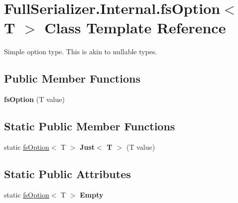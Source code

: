 \hypertarget{struct_full_serializer_1_1_internal_1_1fs_option}{}\section{Full\+Serializer.\+Internal.\+fs\+Option$<$ T $>$ Class Template Reference}
\label{struct_full_serializer_1_1_internal_1_1fs_option}


Simple option type. This is akin to nullable types.  


\subsection*{Public Member Functions}
\begin{DoxyCompactItemize}
\item 
\mbox{\label{struct_full_serializer_1_1_internal_1_1fs_option_a2f7a2155bfce90df62b19977bf6c1e28}} 
{\bfseries fs\+Option} (T value)
\end{DoxyCompactItemize}
\subsection*{Static Public Member Functions}
\begin{DoxyCompactItemize}
\item 
\mbox{\label{struct_full_serializer_1_1_internal_1_1fs_option_a1d4812c279027074394852b9d4305725}} 
static \hyperlink{struct_full_serializer_1_1_internal_1_1fs_option}{fs\+Option}$<$ T $>$ {\bfseries Just$<$ T $>$} (T value)
\end{DoxyCompactItemize}
\subsection*{Static Public Attributes}
\begin{DoxyCompactItemize}
\item 
\mbox{\label{struct_full_serializer_1_1_internal_1_1fs_option_a097ca5b76a5fe79d6b37dd76ec2b5844}} 
static \hyperlink{struct_full_serializer_1_1_internal_1_1fs_option}{fs\+Option}$<$ T $>$ {\bfseries Empty}
\end{DoxyCompactItemize}
